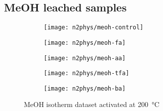 \FloatBarrier%
\pagebreak
\subsection{MeOH leached samples}
\begin{figure}[!h]
    \centering
    \begin{subfigure}{0.4\linewidth}
        \texttt{[image: n2phys/meoh-control]}%
        \label{appx:def:fgr:n2phys-meoh-cont}
    \end{subfigure}%
    \begin{subfigure}{0.4\linewidth}
        \texttt{[image: n2phys/meoh-fa]}%
        \label{appx:def:fgr:n2phys-meoh-fa}
    \end{subfigure}%

    
    \begin{subfigure}{0.4\linewidth}
        \texttt{[image: n2phys/meoh-aa]}%
        \label{appx:def:fgr:n2phys-meoh-aa}
    \end{subfigure}%
    \begin{subfigure}{0.4\linewidth}
        \texttt{[image: n2phys/meoh-tfa]}%
        \label{appx:def:fgr:n2phys-meoh-tfa}
    \end{subfigure}%

    \begin{subfigure}{0.4\linewidth}
        \texttt{[image: n2phys/meoh-ba]}%
        \label{appx:def:fgr:n2phys-meoh-ba}
    \end{subfigure}%

    \caption{MeOH isotherm dataset activated at \SI{200}{\degreeCelsius}}%
    
\end{figure}

\FloatBarrier%
\pagebreak
